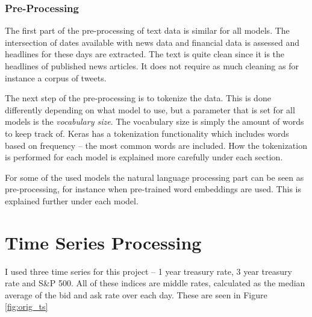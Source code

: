 \subsubsection{Pre-Processing}

The first part of the pre-processing of text data is similar for all models. The intersection of dates available with news data and financial data is assessed and headlines for these days are extracted. The text is quite clean since it is the headlines of published news articles. It does not require as much cleaning as for instance a corpus of tweets. 

The next step of the pre-processing is to tokenize the data. This is done differently depending on what model to use, but a parameter that is set for all models is the \textit{vocabulary size}. The vocabulary size is simply the amount of words to keep track of. Keras has a tokenization functionality which includes words based on frequency -- the most common words are included. How the tokenization is performed for each model is explained more carefully under each section.

For some of the used models the natural language processing part can be seen as pre-processing, for instance when pre-trained word embeddings are used. This is explained further under each model.

\section{Time Series Processing}

I used three time series for this project -- 1 year treasury rate, 3 year treasury rate and S\&P 500. All of these indices are middle rates, calculated as the median average of the bid and ask rate over each day. These are seen in Figure \ref{fig:orig_ts}

